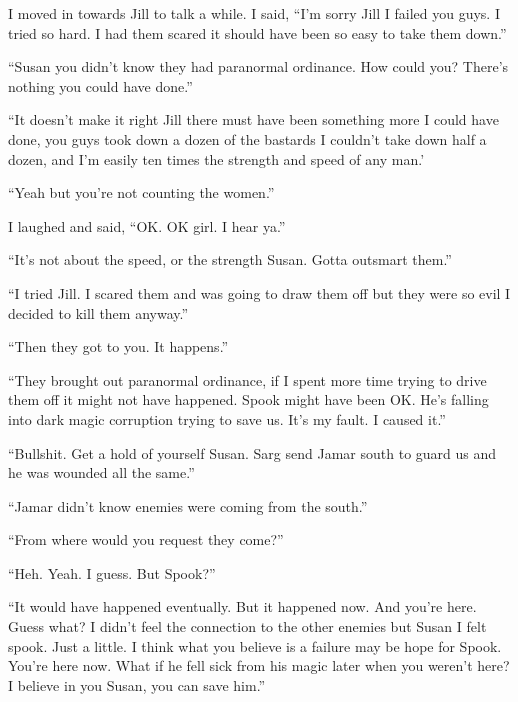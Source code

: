 I moved in towards Jill to talk a while. I said, ``I'm sorry Jill I failed you guys. I tried so hard. I had them scared it should have been so easy to take them down.''

``Susan you didn't know they had paranormal ordinance. How could you? There's nothing you could have done.''  

``It doesn't make it right Jill there must have been something more I could have done, you guys took down a dozen of the bastards I couldn't take down half a dozen, and I'm easily ten times the strength and speed of any man.'

``Yeah but you're not counting the women.''

I laughed and said, ``OK. OK girl. I hear ya.''

``It's not about the speed, or the strength Susan. Gotta outsmart them.''

``I tried Jill. I scared them and was going to draw them off but they were so evil I decided to kill them anyway.''

``Then they got to you. It happens.''

``They brought out paranormal ordinance, if I spent more time trying to drive them off it might not have happened. Spook might have been OK. He's falling into dark magic corruption trying to save us. It's my fault. I caused it.''

``Bullshit. Get a hold of yourself Susan. Sarg send Jamar south to guard us and he was wounded all the same.''

``Jamar didn't know enemies were coming from the south.''

``From where would you request they come?''

``Heh. Yeah. I guess. But Spook?''

``It would have happened eventually. But it happened now. And you're here. Guess what? I didn't feel the connection to the other enemies but Susan I felt spook. Just a little. I think what you believe is a failure may be hope for Spook. You're here now. What if he fell sick from his magic later when you weren't here? I believe in you Susan, you can save him.''







